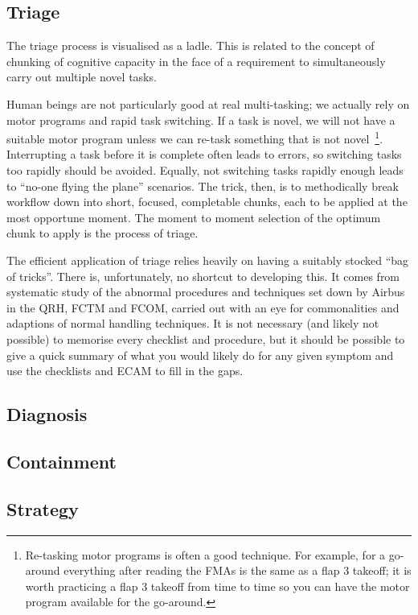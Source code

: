 \documentclass[a5paper,11pt,titlepage]{article} \usepackage[utf8]{inputenc}
\begin{document}
\subsection{Triage}
The triage process is visualised as a ladle. This is related to the
concept of chunking of cognitive capacity in the face of a requirement
to simultaneously carry out multiple novel tasks.

Human beings are not particularly good at real multi-tasking; we
actually rely on motor programs and rapid task switching. If a task is
novel, we will not have a suitable motor program unless we can re-task
something that is not novel\
\footnote{Re-tasking motor programs is often a good technique. For
  example, for a go-around everything after reading the FMAs is the same
  as a flap 3 takeoff; it is worth practicing a flap 3 takeoff from time
  to time so you can have the motor program available for the
  go-around.}. Interrupting a task before it is complete often leads to
errors, so switching tasks too rapidly should be avoided. Equally, not
switching tasks rapidly enough leads to ``no-one flying the plane''
scenarios. The trick, then, is to methodically break workflow down into
short, focused, completable chunks, each to be applied at the most
opportune moment. The moment to moment selection of the optimum chunk to
apply is the process of triage.

The efficient application of triage relies heavily on having a suitably
stocked ``bag of tricks''. There is, unfortunately, no shortcut to
developing this. It comes from systematic study of the abnormal
procedures and techniques set down by Airbus in the QRH, FCTM and FCOM,
carried out with an eye for commonalities and adaptions of normal
handling techniques. It is not necessary (and likely not possible) to
memorise every checklist and procedure, but it should be possible to
give a quick summary of what you would likely do for any given symptom
and use the checklists and ECAM to fill in the gaps.

\subsection{Diagnosis}

\subsection{Containment}
\subsection{Strategy}
\end{document}
